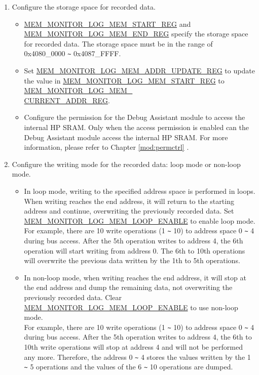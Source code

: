\documentclass[main\_\_EN.tex]{subfiles}
\begin{document}
\begin{enumerate}
\item Configure the storage space for recorded data.
        \begin{itemize}
            \item \hyperref[regdesc:MEMMONITORLOGMEMSTARTREG]{MEM\_MONITOR\_LOG\_MEM\_START\_REG} and \hyperref[regdesc:MEMMONITORLOGMEMENDREG]{MEM\_MONITOR\_LOG\_MEM\_END\_REG} specify the storage space for recorded data. The storage space must be in the range of 0x4080\_0000 \verb+~+ 0x4087\_FFFF.
            \item Set \hyperref[regdesc:MEMMONITORLOGMEMADDRUPDATEREG]{MEM\_MONITOR\_LOG\_MEM\_ADDR\_UPDATE\_REG} to update the value in \hyperref[regdesc:MEMMONITORLOGMEMSTARTREG]{MEM\_MONITOR\_LOG\_MEM\_START\_REG} to \hyperref[regdesc:MEMMONITORLOGMEMCURRENTADDRREG]{MEM\_MONITOR\_LOG\_MEM\_\\CURRENT\_ADDR\_REG}.
            \item Configure the permission for the Debug Assistant module to access the internal HP SRAM. Only when the access permission is enabled can the Debug Assistant module access the internal HP SRAM. For more information, please refer to Chapter \ref{mod:permctrl} \textit{}.
        \end{itemize}

\item Configure the writing mode for the recorded data: loop mode or non-loop mode.
        \begin{itemize}
            \item In loop mode, writing to the specified address space is performed in loops. When writing reaches the end address, it will return to the starting address and continue, overwriting the previously recorded data. Set \hyperref[fielddesc:MEMMONITORLOGMEMLOOPENABLE]{MEM\_MONITOR\_LOG\_MEM\_LOOP\_ENABLE} to enable loop mode.\\
           For example, there are 10 write operations (1 \verb+~+ 10) to address space 0 \verb+~+ 4 during bus access. After the 5th operation writes to address 4, the 6th operation will start writing from address 0. The 6th to 10th operations will overwrite the previous data written by the 1th to 5th operations.
            \item In non-loop mode, when writing reaches the end address, it will stop at the end address and dump the remaining data, not overwriting the previously recorded data. Clear \hyperref[fielddesc:MEMMONITORLOGMEMLOOPENABLE]{MEM\_MONITOR\_LOG\_MEM\_LOOP\_ENABLE} to use non-loop mode.\\
            For example, there are 10 write operations (1 \verb+~+ 10) to address space 0 \verb+~+ 4 during bus access. After the 5th operation writes to address 4, the 6th to 10th write operations will stop at address 4 and will not be performed any more. Therefore, the address 0 \verb+~+ 4 stores the values written by the 1 \verb+~+ 5 operations and the values of the 6 \verb+~+ 10 operations are dumped.
        \end{itemize}


\end{enumerate}
\end{document}
